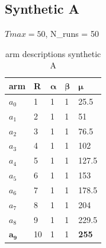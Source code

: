 \subsection{Synthetic A}
$Tmax = 50$,
N\_runs = 50
\begin{table}[H]
	\centering
	\caption{arm descriptions synthetic A}
	\begin{tabular}{|l||l|l|l|l|} 
		\hline
		\textbf{arm} & \textbf{R} & $\boldsymbol{\alpha}$ & $\boldsymbol{\beta}$ & $\boldsymbol{\mu}$  \\ 
		\hline
		$a_0$     & 1          & 1        & 1       & 25.5                    \\ 
		\hline
		$a_1$     & 2          & 1        & 1       & 51                      \\ 
		\hline
		$a_2$     & 3          & 1        & 1       & 76.5                    \\ 
		\hline
		$a_3$     & 4          & 1        & 1       & 102                     \\ 
		\hline
		$a_4$     & 5          & 1        & 1       & 127.5                   \\ 
		\hline
		$a_5$     & 6          & 1        & 1       & 153                     \\ 
		\hline
		$a_6$     & 7          & 1        & 1       & 178.5                   \\ 
		\hline
		$a_7$     & 8          & 1        & 1       & 204                     \\ 
		\hline
		$a_8$     & 9          & 1        & 1       & 229.5                   \\ 
		\hline
		$\boldsymbol{a_9}$        & 10         & 1        & 1       & \textbf{255}                     \\
		\hline
	\end{tabular}
\end{table}

